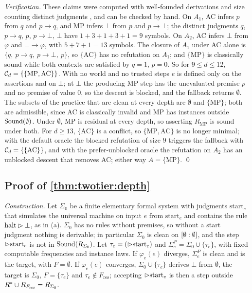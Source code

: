 \emph{Verification.} These claims were computed with well-founded derivations and size counting distinct judgments , and can be checked by hand. On $A_1$, AC infers $p$ from $q$ and $p\to q$, and MP infers $\bot$ from $p$ and $p\to\bot$; the distinct judgments $q$, $p\to q$, $p$, $p\to\bot$, $\bot$ have $1+3+1+3+1=9$ symbols. On $A_2$, AC infers $\bot$ from $\varphi$ and $\bot\to\varphi$, with $5+7+1=13$ symbols. The closure of $A_1$ under AC alone is $\{q,\ p\to q,\ p\to\bot,\ p\}$, so $\{\mathrm{AC}\}$ has no refutation on $A_1$; and $\{\mathrm{MP}\}$ is classically sound while both contexts are satisfied by $q=1$, $p=0$. So for $9\le d\le12$, $\mathcal{C}_d=\{\{\mathrm{MP},\mathrm{AC}\}\}$. With no world and no trusted steps $e$ is defined only on the assertions and on $\bot$; at $\bot$ the producing MP step has the unevaluated premise $p$ and no premise of value $0$, so the descent is blocked, and the fallback returns $\emptyset$. The subsets of the practice that are clean at every depth are $\emptyset$ and $\{\mathrm{MP}\}$; both are admissible, since AC is classically invalid and MP has instances outside $\mathrm{Sound}(\emptyset)$. Under $\emptyset$, MP is residual at every depth, so asserting $R_{\mathrm{MP}}$ is sound under both. For $d\ge13$, $\{\mathrm{AC}\}$ is a conflict, so $\{\mathrm{MP},\mathrm{AC}\}$ is no longer minimal; with the default oracle the blocked refutation of size $9$ triggers the fallback with $\mathcal{C}_d=\{\{\mathrm{AC}\}\}$, and with the prefer-unblocked oracle the refutation on $A_2$ has an unblocked descent that removes AC; either way $A=\{\mathrm{MP}\}$. \qed

\subsection{Proof of \texorpdfstring{\cref{thm:twotier:depth}}{the depth-relativization theorem}}\label{app:twotier:depth}

\emph{Construction.} Let $\Sigma_0$ be a finite elementary formal system \citep{post1943formal,smullyan1961theory} with judgments $\mathrm{start}_e$ that simulates the universal machine on input $e$ from $\mathrm{start}_e$ and contains the rule $\mathrm{halt}\rhd\bot$, as in (a). $\Sigma_0$ has no rules without premises, so without a start judgment nothing is derivable; in particular $\Sigma_0$ is clean on $[\emptyset : \emptyset]$, and the step $\rhd\mathrm{start}_e$ is not in $\mathrm{Sound}(R_{\Sigma_0})$. Let $\tau_e=(\rhd\mathrm{start}_e)$ and $\Sigma^P_e=\Sigma_0\cup\{\tau_e\}$, with fixed computable frequencies and instance laws. If $\varphi_e(e)$ diverges, $\Sigma^P_e$ is clean and is the target, with $F=\emptyset$. If $\varphi_e(e)$ converges, $\Sigma_0\cup\{\tau_e\}$ derives $\bot$ from $\emptyset$, the target is $\Sigma_0$, $F=\{\tau_e\}$ and $\tau_e\notin F_{\mathrm{res}}$; accepting $\rhd\mathrm{start}_e$ is then a step outside $R^{*}\cup R_{F_{\mathrm{res}}}=R_{\Sigma_0}$.

